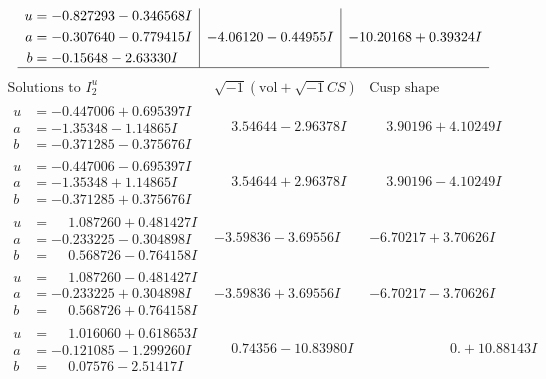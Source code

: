 \documentclass[1p]{elsarticle_modified}
\theoremstyle{definition}
\newcommand{\I}{\sqrt{-1}}
\begin{document}
$$\begin{array}{c|c|c}
\begin{aligned}
u &= -0.827293 - 0.346568 I \\
a &= -0.307640 - 0.779415 I \\
b &= -0.15648 - 2.63330 I\end{aligned}
 & -4.06120 - 0.44955 I & -10.20168 + 0.39324 I\\
 \hline 
 \end{array}$$\newpage$$\begin{array}{c|c|c}  
\text{Solutions to }I^u_{2}& \I (\text{vol} + \sqrt{-1}CS) & \text{Cusp shape}\\
 \hline 
\begin{aligned}
u &= -0.447006 + 0.695397 I \\
a &= -1.35348 - 1.14865 I \\
b &= -0.371285 - 0.375676 I\end{aligned}
 & \phantom{-}3.54644 - 2.96378 I & \phantom{-}3.90196 + 4.10249 I \\ \hline\begin{aligned}
u &= -0.447006 - 0.695397 I \\
a &= -1.35348 + 1.14865 I \\
b &= -0.371285 + 0.375676 I\end{aligned}
 & \phantom{-}3.54644 + 2.96378 I & \phantom{-}3.90196 - 4.10249 I \\ \hline\begin{aligned}
u &= \phantom{-}1.087260 + 0.481427 I \\
a &= -0.233225 - 0.304898 I \\
b &= \phantom{-}0.568726 - 0.764158 I\end{aligned}
 & -3.59836 - 3.69556 I & -6.70217 + 3.70626 I \\ \hline\begin{aligned}
u &= \phantom{-}1.087260 - 0.481427 I \\
a &= -0.233225 + 0.304898 I \\
b &= \phantom{-}0.568726 + 0.764158 I\end{aligned}
 & -3.59836 + 3.69556 I & -6.70217 - 3.70626 I \\ \hline\begin{aligned}
u &= \phantom{-}1.016060 + 0.618653 I \\
a &= -0.121085 - 1.299260 I \\
b &= \phantom{-}0.07576 - 2.51417 I\end{aligned}
 & \phantom{-}0.74356 - 10.83980 I & \phantom{-0.000000 -}0. + 10.88143 I \\ \hline\begin{aligned}

\end{aligned}
\end{array}$$
\end{document}
